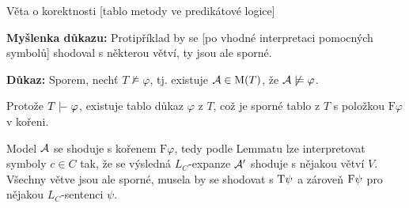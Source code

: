 \documentclass{beamer}
\begin{document}
\begin{frame}{Věta o korektnosti [tablo metody ve predikátové logice]}


    \medskip

    \textbf{Myšlenka důkazu:} Protipříklad by se [po vhodné interpretaci pomocných symbolů] shodoval s některou větví, ty jsou ale sporné.

    \medskip

    \textbf{Důkaz:} Sporem, nechť $T\not\models\varphi$, tj. existuje $\mathcal{A}\in\operatorname{M}(T)$, že $\mathcal{A}\not\models\varphi$.
        
    Protože $T\proves\varphi$, existuje tablo důkaz $\varphi$ z $T$, což je sporné tablo z $T$ s položkou $\mathrm{F}\varphi$ v kořeni. 
        
    Model $\mathcal{A}$ se shoduje s kořenem $\mathrm{F}\varphi$, tedy podle Lemmatu lze interpretovat symboly $c\in C$ tak, že se výsledná $L_C$-expanze $\mathcal{A}'$ shoduje s nějakou větví $V$. Všechny větve jsou ale sporné, musela by se shodovat s $\mathrm{T}\psi$ a zároveň $\mathrm{F}\psi$ pro nějakou $L_C$-sentenci $\psi$.\hfill\qedsymbol

\end{frame}
\end{document}
